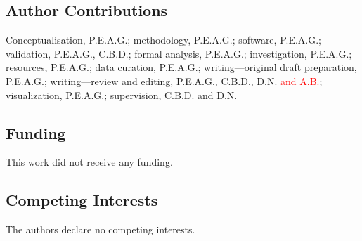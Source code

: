 \documentclass[pdflatex,sn-basic]{sn-jnl}
\begin{document}
\subsection*{Author Contributions}
Conceptualisation, P.E.A.G.; methodology, P.E.A.G.; software, P.E.A.G.; validation, P.E.A.G., C.B.D.; formal analysis, P.E.A.G.; investigation, P.E.A.G.; resources, P.E.A.G.; data curation, P.E.A.G.; writing---original draft preparation, P.E.A.G.; writing---review and editing, P.E.A.G., C.B.D., D.N. \textcolor{red}{and A.B.}; visualization, P.E.A.G.; supervision, C.B.D. and D.N.

\subsection*{Funding}
This work did not receive any funding.

\subsection*{Competing Interests}
The authors declare no competing interests.


\end{document}

